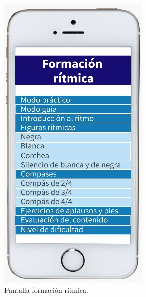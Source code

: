 \documentclass[spanish]{textolivre}
\begin{document}
\vspace{0.25cm}

\noindent
\begin{minipage}[b]{0.30\textwidth}
    \begin{figure}[H]
        \centering
        \includegraphics[width=\linewidth]{Fig7.png}
        \caption{Pantalla formación rítmica.}
    \end{figure}
\end{minipage}
\end{document}
